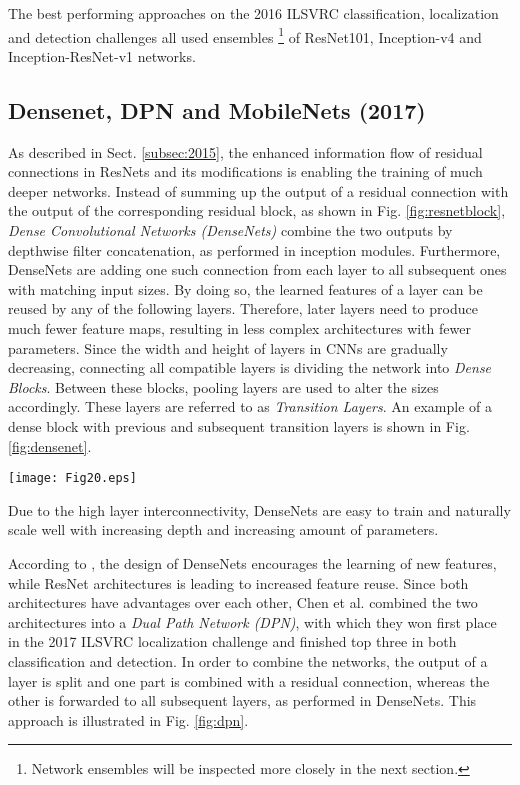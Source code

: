 \documentclass[conference]{IEEEtran}
\begin{document}
The best performing approaches on the 2016 ILSVRC classification, localization and detection challenges all used ensembles \footnote{Network ensembles will be inspected more closely in the next section.} of ResNet101, Inception-v4 and Inception-ResNet-v1 networks.


\subsection{Densenet, DPN and MobileNets (2017)}\label{subsec:2017}

As described in Sect. \ref{subsec:2015}, the enhanced information flow of residual connections in ResNets and its modifications is enabling the training of much deeper networks. Instead of summing up the output of a residual connection with the output of the corresponding residual block, as shown in Fig. \ref{fig:resnetblock}, \emph{Dense Convolutional Networks (DenseNets)}  \cite{DenseNet} combine the two outputs by depthwise filter concatenation, as performed in inception modules. Furthermore, DenseNets are adding one such connection from each layer to all subsequent ones with matching input sizes. By doing so, the learned features of a layer can be reused by any of the following layers. Therefore, later layers need to produce much fewer feature maps, resulting in less complex architectures with fewer parameters. Since the width and height of layers in CNNs are gradually decreasing, connecting all compatible layers is dividing the network into \emph{Dense Blocks}. Between these blocks, pooling layers are used to alter the sizes accordingly. These layers are referred to as \emph{Transition Layers}. An example of a dense block with previous and subsequent transition layers is shown in Fig. \ref{fig:densenet}.

\begin{figure*}
\texttt{[image: Fig20.eps]}
\caption{A dense block of a DenseNet together with the previous and subsequent transition layers. Every layer is directly connected to every subsequent one}
\label{fig:densenet}
\end{figure*}

Due to the high layer interconnectivity, DenseNets are easy to train and naturally scale well with increasing depth and increasing amount of parameters.

According to \cite{DPN}, the design of DenseNets encourages the learning of new features, while ResNet architectures is leading to increased feature reuse. Since both architectures have advantages over each other, Chen et al. combined the two architectures into a \emph{Dual Path Network (DPN)}, with which they won first place in the 2017 ILSVRC localization challenge and finished top three in both classification and detection. In order to combine the networks, the output of a layer is split and one part is combined with a residual connection, whereas the other is forwarded to all subsequent layers, as performed in DenseNets. This approach is illustrated in Fig. \ref{fig:dpn}.
\end{document}
